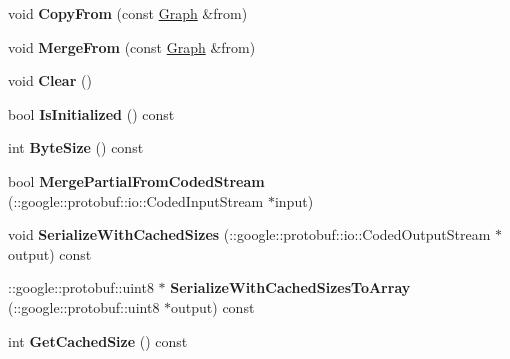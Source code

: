 \begin{DoxyCompactItemize}
\item 
\hypertarget{classgraph_1_1Graph_adea321f8fe4c18ea4d2364c8b8dd54df}{
void {\bfseries CopyFrom} (const \hyperlink{classgraph_1_1Graph}{Graph} \&from)}
\label{classgraph_1_1Graph_adea321f8fe4c18ea4d2364c8b8dd54df}

\item 
\hypertarget{classgraph_1_1Graph_a918dc2343415dd9b7d0deb2c307bfb9d}{
void {\bfseries MergeFrom} (const \hyperlink{classgraph_1_1Graph}{Graph} \&from)}
\label{classgraph_1_1Graph_a918dc2343415dd9b7d0deb2c307bfb9d}

\item 
\hypertarget{classgraph_1_1Graph_a13680e6719e42aa3ebedfeb61ff06014}{
void {\bfseries Clear} ()}
\label{classgraph_1_1Graph_a13680e6719e42aa3ebedfeb61ff06014}

\item 
\hypertarget{classgraph_1_1Graph_ac91ebe6fc014af3707afd28a01bf30cc}{
bool {\bfseries IsInitialized} () const }
\label{classgraph_1_1Graph_ac91ebe6fc014af3707afd28a01bf30cc}

\item 
\hypertarget{classgraph_1_1Graph_ada721f70b6221bd45c0619de513bc138}{
int {\bfseries ByteSize} () const }
\label{classgraph_1_1Graph_ada721f70b6221bd45c0619de513bc138}

\item 
\hypertarget{classgraph_1_1Graph_a3a08a0c8418c6317a890296c25f71b9e}{
bool {\bfseries MergePartialFromCodedStream} (::google::protobuf::io::CodedInputStream $\ast$input)}
\label{classgraph_1_1Graph_a3a08a0c8418c6317a890296c25f71b9e}

\item 
\hypertarget{classgraph_1_1Graph_a69559b8d11a32f5ebe89a0c86b936ed6}{
void {\bfseries SerializeWithCachedSizes} (::google::protobuf::io::CodedOutputStream $\ast$output) const }
\label{classgraph_1_1Graph_a69559b8d11a32f5ebe89a0c86b936ed6}

\item 
\hypertarget{classgraph_1_1Graph_add26e27feb424b498dc6e7c54250886b}{
::google::protobuf::uint8 $\ast$ {\bfseries SerializeWithCachedSizesToArray} (::google::protobuf::uint8 $\ast$output) const }
\label{classgraph_1_1Graph_add26e27feb424b498dc6e7c54250886b}

\item 
\hypertarget{classgraph_1_1Graph_a2a609292df58baec63cb473317334301}{
int {\bfseries GetCachedSize} () const }
\label{classgraph_1_1Graph_a2a609292df58baec63cb473317334301}


\end{DoxyCompactItemize}
